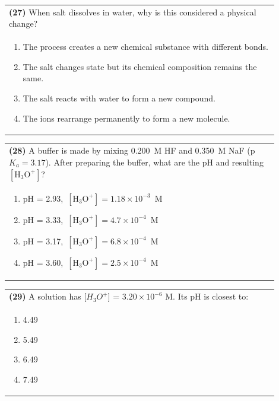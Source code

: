 \documentclass{article}
\begin{document}
\noindent\begin{tabular}{|p{0.9\linewidth}|}
\hline
\textbf{(27)} When salt dissolves in water, why is this considered a physical change? \\
\begin{minipage}[t]{0.85\linewidth}
\begin{enumerate}[label=\alph*.]
    \item The process creates a new chemical substance with different bonds.
    \item The salt changes state but its chemical composition remains the same.
    \item The salt reacts with water to form a new compound.
    \item The ions rearrange permanently to form a new molecule.
\end{enumerate}
\end{minipage}\\[0.2cm]
\hline
\end{tabular}

\noindent\begin{tabular}{|p{0.9\linewidth}|}
\hline
\textbf{(28)} A buffer is made by mixing 0.200~M HF and 0.350~M NaF (p$K_a=3.17$). After preparing the buffer, what are the pH and resulting $[\mathrm{H_3O^+}]$?\\[0.2cm]
\begin{minipage}[t]{0.85\linewidth}
\begin{enumerate}[label=\alph*.]
\item pH = 2.93,\ $[\mathrm{H_3O^+}] = 1.18\times10^{-3}$~M
\item pH = 3.33,\ $[\mathrm{H_3O^+}] = 4.7\times10^{-4}$~M
\item pH = 3.17,\ $[\mathrm{H_3O^+}] = 6.8\times10^{-4}$~M
\item pH = 3.60,\ $[\mathrm{H_3O^+}] = 2.5\times10^{-4}$~M
\end{enumerate}
\end{minipage}\\[0.2cm]
\hline
\end{tabular}

\noindent\begin{tabular}{|p{0.9\linewidth}|}
\hline
\textbf{(29)} A solution has [$H_3O^+$] = $3.20\times10^{-6}$ M. Its pH is closest to: \\[0.2cm]
\begin{minipage}{0.85\linewidth}
\begin{enumerate}[label=\alph*.]
\item 4.49 \item 5.49 \item 6.49 \item 7.49
\end{enumerate}
\end{minipage}\\[0.2cm]
\hline
\end{tabular}
\end{document}
